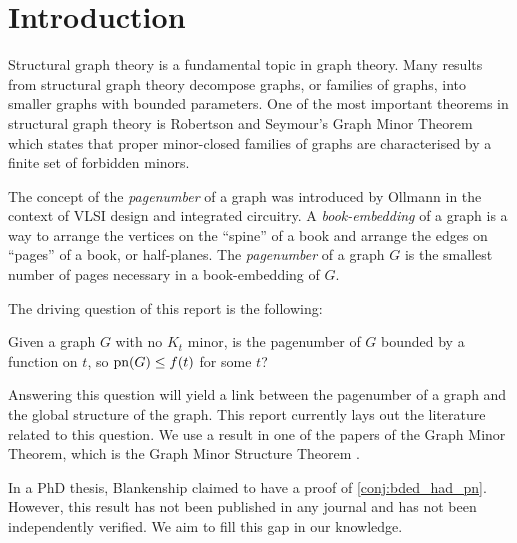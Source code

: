 \chapter{Introduction}\label{sec:introduction}
Structural graph theory is a fundamental topic in graph theory. Many results from structural graph theory decompose graphs, or families of graphs, into smaller graphs with bounded parameters. One of the most important theorems in structural graph theory is Robertson and Seymour's Graph Minor Theorem \cite{robertsonGraphMinorsXX2004} which states that proper minor-closed families of graphs are characterised by a finite set of forbidden minors. 
\par
The concept of the \textit{pagenumber} of a graph was introduced by Ollmann \cite{ollmannBookThicknessVarious1973} in the context of VLSI design and integrated circuitry. A \textit{book-embedding} of a graph is a way to arrange the vertices on the ``spine'' of a book and arrange the edges on ``pages'' of a book, or half-planes. The \textit{pagenumber} of a graph $G$ is the smallest number of pages necessary in a book-embedding of $G$. 

The driving question of this report is the following: 
\begin{conjecture}\label{conj:bded_had_pn}
	Given a graph $G$ with no $K_t$ minor, is the pagenumber of $G$ bounded by a function on $t$, so $\text{pn}(G) \leq f(t)$ for some $t$?
\end{conjecture}
Answering this question will yield a link between the pagenumber of a graph and the global structure of the graph. This report currently lays out the literature related to this question. We use a result in one of the papers of the Graph Minor Theorem, which is the Graph Minor Structure Theorem \cite{robertsonGraphMinorsXVI2003}.

In a PhD thesis, Blankenship claimed to have a proof of \cref{conj:bded_had_pn}.\cite{Blankenship-PhD03} However, this result has not been published in any journal and has not been independently verified. We aim to fill this gap in our knowledge. 
